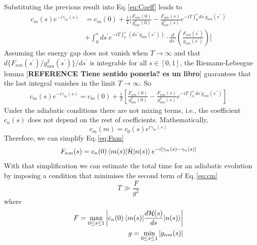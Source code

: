  Substituting the previous result into Eq.\,\eqref{eq:Coeff} leads to
 \begin{equation}
 \begin{split}
      c_{m}(s)e^{-i\gamma_{m}(s)} & = c_{m}(0) + \frac{i}{T}\Biggr[\frac{F_{nm}(0)}{g^{2}_{nm}(0)} - \frac{F_{nm}(s)}{g^{2}_{nm}(s)}e^{-iT\int_{0}^{s}ds^{\prime}g_{nm}(s^{\prime \prime})} \\
      & + \int_{0}^{s}ds^{\prime} e^{-iT\int_{0}^{s^{\prime}}\left(ds^{\prime \prime}g_{nm}(s^{\prime\prime}) \right)} \cdot \frac{d}{ds^{\prime}}\left(\frac{F_{nm}(s^{\prime})}{g_{nm}(s^{\prime})}\right)\Biggr]
\end{split}
\end{equation}
 Assuming the energy gap does not vanish when $T \rightarrow \infty$ and that $d\{F_{nm}(s^{\prime})/g_{nm}^{2}(s^{\prime})\}/ds^{\prime}$ is integrable for all $s \in [0,1]$, the Riemann-Lebesgue lemma [\textbf{REFERENCE Tiene sentido ponerla? es un libro}] guarantees that the last integral vanishes in the limit $T \rightarrow \infty$. So
  \begin{align}
  \label{eq:cm}
     c_{m}(s)e^{-i\gamma_{m}(s)} = c_{m}(0) + \frac{i}{T}\left[\frac{F_{nm}(0)}{g^{2}_{nm}(0)} - \frac{F_{nm}(s)}{g^{2}_{nm}(s)}e^{-iT\int_{0}^{s}ds^{\prime}g_{nm}(s^{\prime \prime})}\right] 
 \end{align}
 Under the adiabatic conditions there are not mixing terms, i.e., the coefficient $c_{n}(s)$ does not depend on the rest of coefficients. Mathematically,
\begin{equation}
    c_{m}(m) = c_{0}(s)e^{i\gamma_{m}(s)}
\end{equation}
Therefore, we can simplify Eq.\,\eqref{eq:Fnm}
\begin{equation}
    F_{nm}(s) = c_{n}(0)\braket{m(s)|\dot{\mathcal{H}}|n(s)} e^{-i\left[\gamma_{m}(s) - \gamma_{n}(s)\right]}
\end{equation}
 With that simplification we can estimate the total time for an adiabatic evolution by imposing a condition that minimises the second term of Eq.\,\eqref{eq:cm}
 \begin{equation}
     T \gg \frac{F}{g^{2}}
 \end{equation}
 where
 \begin{align}
     F = \max_{0 \leq s \leq 1} \left|c_{n}(0)\braket{m(s)|\frac{d\mathcal{H}(s)}{ds}| n(s)}\right| \\
     g = \min_{0 \leq s \leq 1} |g_{nm}(s)|
 \end{align}
